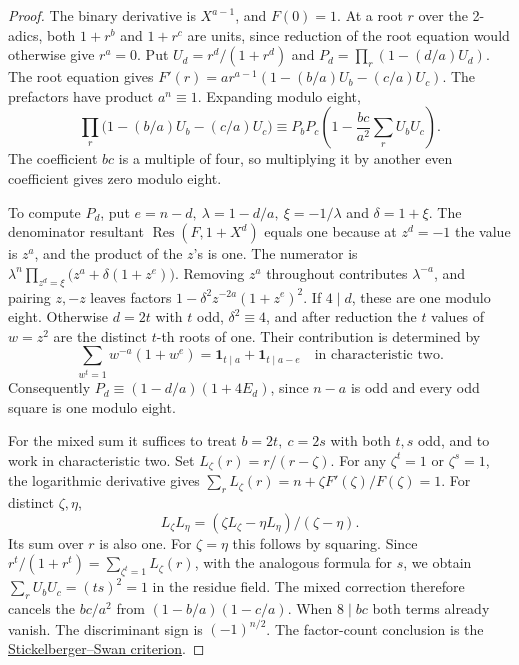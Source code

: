 \documentclass[11pt]{article}
\begin{document}
\begin{proof}
The binary derivative is \(X^{a-1}\), and \(F(0)=1\). At a root
\(r\) over the 2-adics, both \(1+r^b\) and \(1+r^c\) are units,
since reduction of the root equation would otherwise give \(r^a=0\).
Put \(U_d=r^d/(1+r^d)\) and \(P_d=\prod_r(1-(d/a)U_d)\). The
root equation gives \(F'(r)=ar^{a-1}(1-(b/a)U_b-(c/a)U_c)\).
The prefactors have product \(a^n\equiv1\). Expanding modulo eight,
\[
 \prod_r\bigl(1-(b/a)U_b-(c/a)U_c\bigr)
 \equiv P_bP_c\left(1-\frac{bc}{a^2}\sum_r U_bU_c\right).
\]
The coefficient \(bc\) is a multiple of four, so multiplying it by
another even coefficient gives zero modulo eight.

To compute \(P_d\), put \(e=n-d,\ \lambda=1-d/a,\ \xi=-1/\lambda\)
and \(\delta=1+\xi\). The denominator resultant
\(\operatorname{Res}(F,1+X^d)\) equals one because at \(z^d=-1\) the value is
\(z^a\), and the product of the \(z\)'s is one. The numerator is
\(\lambda^n\prod_{z^d=\xi}\bigl(z^a+\delta(1+z^e)\bigr)\).
Removing \(z^a\) throughout contributes \(\lambda^{-a}\), and
pairing \(z,-z\) leaves factors \(1-\delta^2 z^{-2a}(1+z^e)^2\).
If \(4\mid d\), these are one modulo eight. Otherwise \(d=2t\) with
\(t\) odd, \(\delta^2\equiv4\), and after reduction the \(t\) values
of \(w=z^2\) are the distinct \(t\)-th roots of one. Their contribution
is determined by
\[
 \sum_{w^t=1}w^{-a}(1+w^e)=\mathbf1_{t\mid a}+\mathbf1_{t\mid a-e}
 \quad\text{in characteristic two}.
\]
Consequently \(P_d\equiv(1-d/a)(1+4E_d)\), since \(n-a\) is odd
and every odd square is one modulo eight.

For the mixed sum it suffices to treat \(b=2t,\ c=2s\) with both
\(t,s\) odd, and to work in characteristic two. Set
\(L_\zeta(r)=r/(r-\zeta)\). For any \(\zeta^t=1\) or \(\zeta^s=1\),
the logarithmic derivative gives
\(\sum_r L_\zeta(r)=n+\zeta F'(\zeta)/F(\zeta)=1\).
For distinct \(\zeta,\eta\),
\[
 L_\zeta L_\eta=(\zeta L_\zeta-\eta L_\eta)/(\zeta-\eta).
\]
Its sum over \(r\) is also one. For \(\zeta=\eta\) this follows by
squaring. Since \(r^t/(1+r^t)=\sum_{\zeta^t=1}L_\zeta(r)\), with
the analogous formula for \(s\), we obtain
\(\sum_r U_b U_c=(ts)^2=1\) in the residue field.
The mixed correction therefore cancels the \(bc/a^2\) from
\((1-b/a)(1-c/a)\). When \(8\mid bc\) both terms already vanish.
The discriminant sign is \((-1)^{n/2}\).
The factor-count conclusion is the
\href{https://msp.org/pjm/1962/12-3/pjm-v12-n3-p27-p.pdf}{Stickelberger--Swan criterion}.
\end{proof}
\end{document}
